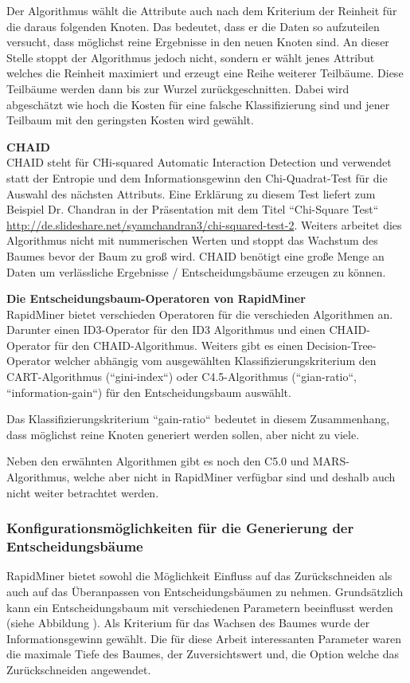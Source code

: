 Der Algorithmus wählt die Attribute auch nach dem Kriterium der Reinheit für die daraus folgenden Knoten. Das bedeutet, dass er die Daten so aufzuteilen versucht, dass möglichst reine Ergebnisse in den neuen Knoten sind. An dieser Stelle stoppt der Algorithmus jedoch nicht, sondern er wählt jenes Attribut welches die Reinheit maximiert und erzeugt  eine Reihe weiterer Teilbäume. Diese Teilbäume werden dann bis zur Wurzel zurückgeschnitten. Dabei wird abgeschätzt wie hoch die Kosten für eine falsche Klassifizierung sind und jener Teilbaum mit den geringsten Kosten wird gewählt. \cite{wei-yin_loh_classification_2008}

\textbf{CHAID} \\
CHAID steht für  CHi-squared Automatic Interaction Detection und verwendet statt der Entropie und dem Informationsgewinn den Chi-Quadrat-Test für die Auswahl des nächsten Attributs. Eine Erklärung zu diesem Test liefert zum Beispiel Dr. Chandran in der Präsentation mit dem Titel ``Chi-Square Test``  \url{http://de.slideshare.net/syamchandran3/chi-squared-test-2}.
Weiters arbeitet dies Algorithmus nicht mit nummerischen Werten und stoppt das Wachstum des Baumes bevor der Baum zu groß wird. CHAID benötigt eine große Menge an Daten um verlässliche Ergebnisse / Entscheidungsbäume erzeugen zu können.\cite{rapidminer_rapidminer_2015}

\textbf{Die Entscheidungsbaum-Operatoren von RapidMiner} \\
RapidMiner bietet verschieden Operatoren für die verschieden Algorithmen an. Darunter einen ID3-Operator für den ID3 Algorithmus und einen CHAID-Operator für den CHAID-Algorithmus. Weiters gibt es einen Decision-Tree-Operator welcher abhängig vom ausgewählten Klassifizierungskriterium den CART-Algorithmus (``gini-index``)  oder C4.5-Algorithmus (``gian-ratio``, ``information-gain``) für den Entscheidungsbaum auswählt. \cite{rapidminer_rapidminer_2015} 

Das Klassifizierungskriterium ``gain-ratio`` bedeutet in diesem Zusammenhang, dass möglichst reine Knoten generiert werden sollen, aber nicht zu viele. \cite{rapidminer_rapidminer_2015} 

Neben den erwähnten Algorithmen gibt es noch den C5.0 und MARS-Algorithmus, welche aber nicht in RapidMiner verfügbar sind und deshalb auch nicht weiter betrachtet werden.

\subsubsection{Konfigurationsmöglichkeiten für die Generierung der Entscheidungsbäume}
RapidMiner bietet sowohl die Möglichkeit Einfluss auf das Zurückschneiden als auch auf das Überanpassen von Entscheidungsbäumen zu nehmen. Grundsätzlich kann ein Entscheidungsbaum mit verschiedenen Parametern beeinflusst werden (siehe Abbildung ). Als Kriterium für das Wachsen des Baumes wurde der Informationsgewinn gewählt. Die für diese Arbeit interessanten Parameter waren die maximale Tiefe des Baumes, der Zuversichtswert und, die Option welche das Zurückschneiden angewendet.

